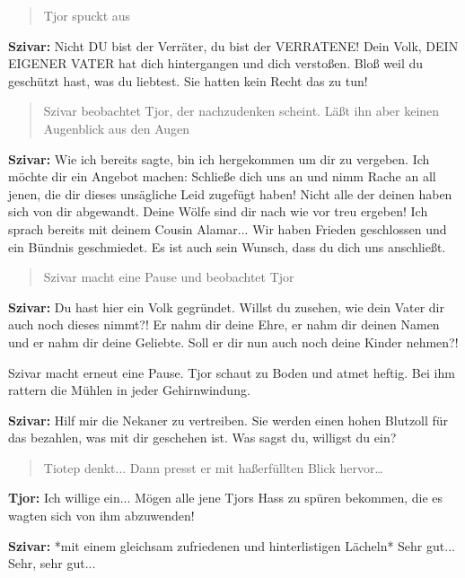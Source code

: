 \documentclass[a5paper,6pt]{book}
\begin{document}
\begin{quote}
Tjor spuckt aus                                              
 \end{quote} 


\textbf{Szivar:} Nicht DU bist der Verräter, du bist der VERRATENE! Dein Volk, DEIN EIGENER
VATER hat dich hintergangen und dich verstoßen. Bloß weil du geschützt hast, was
du liebtest. Sie hatten kein Recht das zu tun!

\begin{quote}
Szivar beobachtet Tjor, der nachzudenken scheint. Läßt ihn aber keinen Augenblick aus den Augen                                           
 \end{quote} 


\textbf{Szivar:} Wie ich bereits sagte, bin ich hergekommen um dir zu vergeben. Ich möchte dir ein
Angebot machen: Schließe dich uns an und nimm Rache an all jenen, die dir dieses
unsägliche Leid zugefügt haben! Nicht alle der deinen haben sich von dir abgewandt.
Deine Wölfe sind dir nach wie vor treu ergeben! Ich sprach bereits mit deinem
Cousin Alamar... Wir haben Frieden geschlossen und ein Bündnis geschmiedet. Es ist
auch sein Wunsch, dass du dich uns anschließt.

\begin{quote}
Szivar macht eine Pause und beobachtet Tjor                                           
 \end{quote} 

\textbf{Szivar:} Du hast hier ein Volk gegründet. Willst du zusehen, wie dein Vater dir auch noch
dieses nimmt?! Er nahm dir deine Ehre, er nahm dir deinen Namen und er nahm dir
deine Geliebte. Soll er dir nun auch noch deine Kinder nehmen?!

Szivar macht erneut eine Pause. Tjor schaut zu Boden und atmet heftig. Bei ihm rattern die
Mühlen in jeder Gehirnwindung.

\textbf{Szivar:} Hilf mir die Nekaner zu vertreiben. Sie werden einen hohen Blutzoll für das bezahlen,
was mit dir geschehen ist. Was sagst du, willigst du ein?

\begin{quote}
Tiotep denkt... Dann presst er mit haßerfüllten Blick hervor…                                         
 \end{quote} 

\textbf{Tjor:} Ich willige ein... Mögen alle jene Tjors Hass zu spüren bekommen, die es wagten sich
von ihm abzuwenden!

\textbf{Szivar:} *mit einem gleichsam zufriedenen und hinterlistigen Lächeln* Sehr gut... Sehr, sehr
gut...
\end{document}
